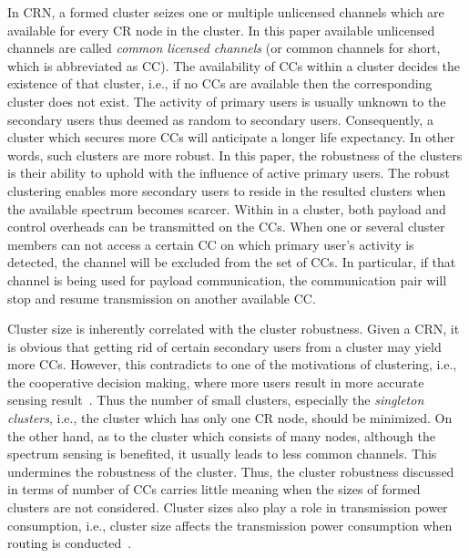 \documentclass[times]{ettauth}
\newcommand{\ie}{i.e., }
\theoremstyle{mytheoremstyle}
\theoremstyle{mytheoremstyle}
\theoremstyle{mytheoremstyle}
\begin{document}
In CRN, a formed cluster seizes one or multiple unlicensed channels which are available for every CR node in the cluster.
In this paper available unlicensed channels are called \textit{common licensed channels} (or common channels for short, which is abbreviated as CC).
The availability of CCs within a cluster decides the existence of that cluster, \ie if no CCs are available then the corresponding cluster does not exist.
The activity of primary users is usually unknown to the secondary users thus deemed as random to secondary users.
Consequently, a cluster which secures more CCs will anticipate a longer life expectancy. 
In other words, such clusters are more robust.
In this paper, the robustness of the clusters is their ability to uphold with the influence of active primary users.
The robust clustering enables more secondary users to reside in the resulted clusters when the available spectrum becomes scarcer.
%
Within in a cluster, both payload and control overheads can be transmitted on the CCs.
When one or several cluster members can not access a certain CC on which primary user's activity is detected, the channel will be excluded from the set of CCs.
In particular, if that channel is being used for payload communication, the communication pair will stop and resume transmission on another available CC.


Cluster size is inherently correlated with the cluster robustness.
Given a CRN, it is obvious that getting rid of certain secondary users from a cluster may yield more CCs.
However, this contradicts to one of the motivations of clustering, \ie the cooperative decision making, where more users result in more accurate sensing result~\cite{Consensus_based_clustering12}.
Thus the number of small clusters, especially the \textit{singleton clusters}, \ie the cluster which has only one CR node, should be minimized.
On the other hand, as to the cluster which consists of many nodes, although the spectrum sensing is benefited, it usually leads to less common channels. This undermines the robustness of the cluster.
Thus, the cluster robustness discussed in terms of number of CCs carries little meaning when the sizes of formed clusters are not considered.
Cluster sizes also play a role in transmission power consumption, \ie cluster size affects the transmission power consumption when routing is conducted~\cite{clustering_globecom11, EnergyEfficientClusteringRouting_2015}.
\end{document}
